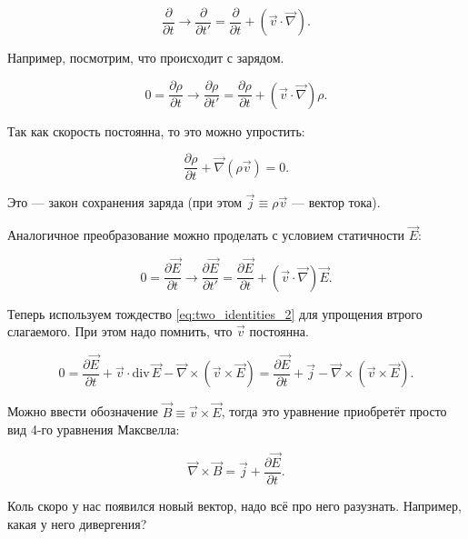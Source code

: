 \documentclass[12pt]{article}
\newcommand{\pt}{\partial}
\renewcommand{\div}{\mathrm{div}\,}
\newcommand{\vn}{\vec{\nabla}}
\begin{document}
\begin{equation}
  \label{eq:transf_galileo}
  \frac{\pt}{\pt t} \to \frac{\pt}{\pt t'} = \frac{\pt}{\pt t} +
  \left( \vec{v} \cdot \vn \right).
\end{equation}

Например, посмотрим, что происходит с зарядом. 

\begin{equation}
  \label{eq:transf_charge}
  0 = \frac{\pt \rho}{\pt t} \to \frac{\pt \rho}{\pt t'} = \frac{\pt
    \rho}{\pt t} + \left( \vec{v} \cdot \vn \right) \rho.
\end{equation}

Так как скорость постоянна, то это можно упростить: 

\begin{equation}
  \label{eq:charge_consrv}
  \frac{\pt \rho}{\pt t} + \vn \left( \rho \vec{v} \right) =0 .
\end{equation}

Это — закон сохранения заряда (при этом $\vec{j} \equiv \rho \vec{v}$
— вектор тока). 

Аналогичное преобразование можно проделать с условием статичности
$\vec{E}$:

\begin{equation}
  \label{eq:E_field_transf}
  0 = \frac{\pt \vec{E}}{\pt t} \to \frac{\pt \vec{E}}{\pt t'} =
  \frac{\pt \vec{E}}{\pt t} + \left( \vec{v} \cdot \vn \right) \vec{E}.
\end{equation}

Теперь используем тождество \eqref{eq:two_identities_2} для упрощения
втрого слагаемого. При этом надо помнить, что $\vec{v}$ постоянна.

\begin{equation}
  0 = \frac{\pt \vec{E}}{\pt t} + \vec{v} \cdot \div \vec{E} - \vn
  \times \left( \vec{v} \times \vec{E} \right) = \frac{\pt
    \vec{E}}{\pt t} + \vec{j} - \vn 
  \times \left( \vec{v} \times \vec{E} \right).
\end{equation}

Можно ввести обозначение $\vec{B} \equiv \vec{v} \times \vec{E}$,
тогда это уравнение приобретёт просто вид 4-го уравнения Максвелла: 

\begin{equation}
  \label{eq:maxwell_4}
  \vn \times \vec{B} = \vec{j} + \frac{\pt \vec{E}}{\pt t}.
\end{equation}

Коль скоро у нас появился новый вектор, надо всё про него
разузнать. Например, какая у него дивергения? 
\end{document}
